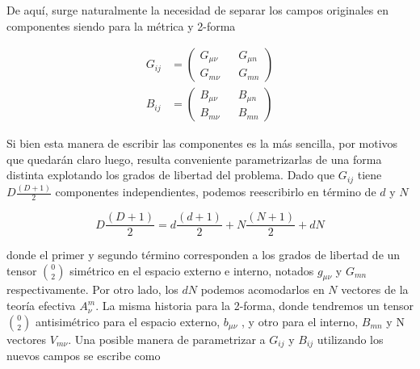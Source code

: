 \documentclass{article}
\numberwithin{equation}{section}
\begin{document}
De aquí, surge naturalmente la necesidad de separar los campos originales en componentes siendo para la métrica y 2-forma

\begin{equation}
\begin{aligned}
G_{i j} &= 
\begin{pmatrix}
G_{\mu \nu} && G_{\mu n}\\
G_{m \nu} && G_{m n}
\end{pmatrix}\\
B_{i j} &= 
\begin{pmatrix}
B_{\mu \nu} && B_{\mu n}\\
B_{m \nu} && B_{m n}
\end{pmatrix}
\end{aligned}
\end{equation}

Si bien esta manera de escribir las componentes es la más sencilla, por motivos que quedarán claro luego, resulta conveniente parametrizarlas de una forma distinta explotando los grados de libertad del problema. Dado que $ G_{i j} $ tiene $ D\frac{\left(D+1\right)}{2} $ componentes independientes, podemos reescribirlo en término de $ d $ y $ N $

\begin{equation}
D\frac{\left(D+1\right)}{2} = d\frac{\left(d+1\right)}{2} + N\frac{\left(N+1\right)}{2} +d N
\end{equation}

donde el primer y segundo término corresponden a los grados de libertad de un tensor $ \binom{0}{2} $ simétrico en el espacio externo e interno, notados $ g_{\mu \nu} $ y $ G_{m n} $ respectivamente. Por otro lado, los $ d N $ podemos acomodarlos en $ N $ vectores de la teoría efectiva $ A^m_{\nu} $. La misma historia para la 2-forma, donde tendremos un tensor $ \binom{0}{2} $ antisimétrico para el espacio externo, $ b_{\mu \nu} $ , y otro para el interno, $ B_{m n} $ y N vectores $ V_{m \nu} $. Una posible manera de parametrizar a $ G_{i j} $ y $ B_{i j} $ utilizando los nuevos campos se escribe como
\end{document}

